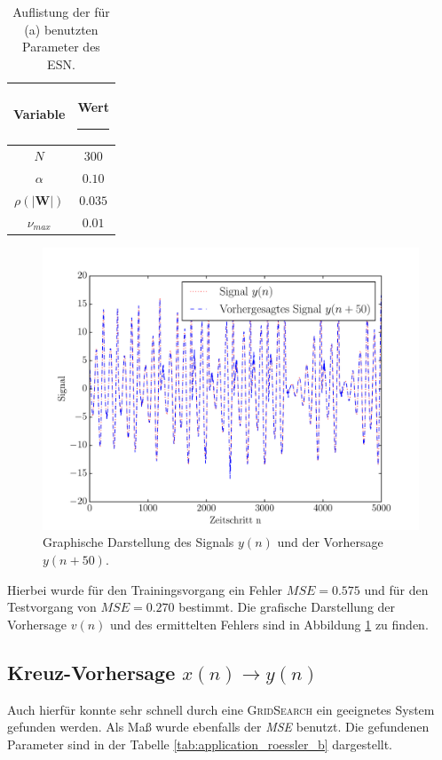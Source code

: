 \begin{table}[H]
	\centering
		\begin{tabular}{|c|c|}
		\rule[-1ex]{0pt}{4.5ex} Variable & \hspace{4ex} Wert \rule[-1ex]{4ex}{0pt}\\ 
		\hline \hline 
		\rule[-1ex]{0pt}{4.5ex} $N$ & $300$ \\ 
		\hline 
		\rule[-1ex]{0pt}{4.5ex} $\alpha$ & $0.10$ \\ 
		\hline 
		\rule[-1ex]{0pt}{4.5ex} $\rho(|\mathbf{W}|)$ & $0.035$ \\ 
		\hline 
		\rule[-1ex]{0pt}{4.5ex} $\nu_{max}$ & $0.01$ \\ 
		\hline 
	\end{tabular} 
	\caption{Auflistung der für (a) benutzten Parameter des \textsc{ESN}.}
\label{tab:application_roessler_a}
\end{table}
\begin{figure}[H]
    \centering
    \includegraphics[width = 0.9 \textwidth]{figures/roessler_pred50.pdf}
    \caption{Graphische Darstellung des Signals $y(n)$ und der Vorhersage $y(n+50)$.}
    \label{fig:application_roessler_a}
\end{figure}

Hierbei wurde für den Trainingsvorgang ein Fehler $MSE = 0.575$ und für den Testvorgang von $MSE = 0.270$ bestimmt. Die grafische Darstellung der Vorhersage $v(n)$ und des ermittelten Fehlers sind in Abbildung \ref{fig:application_roessler_a} zu finden.

\subsection{Kreuz-Vorhersage $x(n) \rightarrow y(n)$}
Auch hierfür konnte sehr schnell durch eine \textsc{GridSearch} ein geeignetes System gefunden werden. Als Maß wurde ebenfalls der \textit{MSE} benutzt. Die gefundenen Parameter sind in der Tabelle \ref{tab:application_roessler_b} dargestellt.

